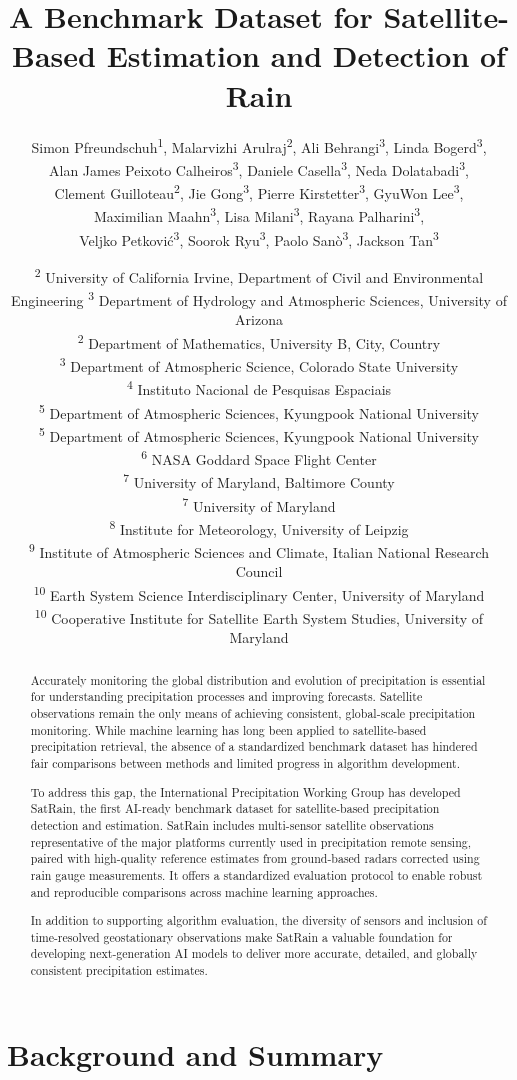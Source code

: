 \documentclass[11pt]{article}
\title{A Benchmark Dataset for Satellite-Based Estimation and Detection of Rain}
\author{%
Simon Pfreundschuh\textsuperscript{1}, %
Malarvizhi Arulraj\textsuperscript{2}, %
Ali Behrangi\textsuperscript{3}, %
Linda Bogerd\textsuperscript{3}, \\
Alan James Peixoto Calheiros\textsuperscript{3}, %
Daniele Casella\textsuperscript{3}, %
Neda Dolatabadi\textsuperscript{3}, \\ %
Clement Guilloteau\textsuperscript{2}, %
Jie Gong\textsuperscript{3}, %
Pierre Kirstetter\textsuperscript{3}, %
GyuWon Lee\textsuperscript{3}, \\ %
Maximilian Maahn\textsuperscript{3}, %
Lisa Milani\textsuperscript{3}, %
Rayana Palharini\textsuperscript{3},\\%
Veljko Petković\textsuperscript{3}, %
Soorok Ryu\textsuperscript{3}, %
Paolo Sanò\textsuperscript{3}, %
Jackson Tan\textsuperscript{3}\\
}
\date{
  \textsuperscript{2} University of California Irvine, Department of Civil and Environmental Engineering
  \textsuperscript{3} Department of Hydrology and Atmospheric Sciences, University of Arizona\\
  \textsuperscript{2} Department of Mathematics, University B, City, Country \\
  \textsuperscript{3} Department of Atmospheric Science, Colorado State University \\
  \textsuperscript{4} Instituto Nacional de Pesquisas Espaciais \\
  \textsuperscript{5} Department of Atmospheric Sciences, Kyungpook National University \\
  \textsuperscript{5} Department of Atmospheric Sciences, Kyungpook National University \\
  \textsuperscript{6} NASA Goddard Space Flight Center \\
  \textsuperscript{7} University of Maryland, Baltimore County \\
  \textsuperscript{7} University of Maryland\\
  \textsuperscript{8} Institute for Meteorology, University of Leipzig \\
  \textsuperscript{9} Institute of Atmospheric Sciences and Climate, Italian National Research Council \\
  \textsuperscript{10} Earth System Science Interdisciplinary Center, University of Maryland  \\
  \textsuperscript{10} Cooperative Institute for Satellite Earth System Studies, University of Maryland  \\
}
\date{}
\begin{document}
\maketitle

\begin{abstract}

Accurately monitoring the global distribution and evolution of precipitation is
essential for understanding precipitation processes and improving forecasts.
Satellite observations remain the only means of achieving consistent,
global-scale precipitation monitoring. While machine learning has long been
applied to satellite-based precipitation retrieval, the absence of a
standardized benchmark dataset has hindered fair comparisons between methods and
limited progress in algorithm development.

To address this gap, the International Precipitation Working Group has developed
SatRain, the first AI-ready benchmark dataset for satellite-based precipitation
detection and estimation. SatRain includes multi-sensor satellite observations
representative of the major platforms currently used in precipitation remote
sensing, paired with high-quality reference estimates from ground-based radars
corrected using rain gauge measurements. It offers a standardized evaluation
protocol to enable robust and reproducible comparisons across machine learning
approaches.

In addition to supporting algorithm evaluation, the diversity of sensors and
inclusion of time-resolved geostationary observations make SatRain a valuable
foundation for developing next-generation AI models to deliver more accurate,
detailed, and globally consistent precipitation estimates.

\end{abstract}

\section{Background and Summary}
\end{document}

